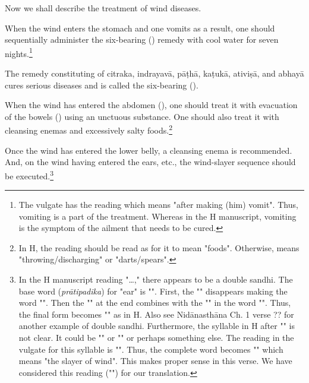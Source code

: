 \begin{translation}
    
    \item [1] 
    Now we shall describe the treatment of wind diseases.
    
    \item [2]

    \item [3]
    When the wind enters the stomach and one vomits as a result, one should sequentially administer the six-bearing () remedy with cool water for seven nights.\footnote{The vulgate has the reading  which means "after making (him) vomit". Thus, vomiting is a part of the treatment. Whereas in the H manuscript, vomiting is the symptom of the ailment that needs to be cured.}

    \item [4]
    The remedy constituting of \gls{citraka}, \gls{indrayavā}, \gls{pāṭhā}, \gls{kaṭukā}, \gls{ativiṣā}, and \gls{abhayā} cures serious diseases and is called the six-bearing ().

    \item [5]
    When the wind has entered the abdomen (), one should treat it with evacuation of the bowels () using an unctuous substance. One should also treat it with cleansing enemas and excessively salty foods.\footnote{In H, the reading  should be read as  for it to mean "foods". Otherwise,  means "throwing/discharging" or "darts/spears".} 

    \item [6]
    Once the wind has entered the lower belly, a cleansing enema is recommended. And, on the wind having entered the ears, etc., the wind-slayer sequence should be executed.\footnote{In the H manuscript reading "\ldots," there appears to be a double sandhi. The base word (\emph{prātipadika}) for "ear" is "". First, the "" disappears making the word "". Then the "" at the end combines with the "" in the word "". Thus, the final form becomes "" as in H. Also see Nidānasthāna Ch. 1 verse ?? for another example of double sandhi.
    Furthermore, the syllable in H after "" is not clear. It could be "" or "" or perhaps something else. The reading in the vulgate for this syllable is "". Thus, the complete word becomes "" which means "the slayer of wind". This makes proper sense in this verse. We have considered this reading ("") for our translation.}    


\end{translation}
